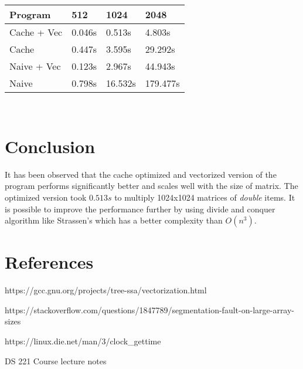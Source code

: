 \documentclass[11pt,a4paper,oneside]{article}
\begin{document}
    
	\begin{center}
	\begin{tabular}{|l|l|l|l|}
		\hline
		Program & 512 & 1024 &  2048\\
		\hline
		Cache + Vec & 0.046s & 0.513s & 4.803s \\
		Cache & 0.447s & 3.595s & 29.292s \\
		Naive + Vec & 0.123s & 2.967s & 44.943s \\
		Naive & 0.798s & 16.532s & 179.477s \\				
		\hline
	\end{tabular}
	\end{center}

     \begin{verbatim}
    
    \end{verbatim}

    \section{Conclusion}
    It has been observed that the cache optimized and vectorized version of the program performs significantly better and scales well with the size of matrix. The optimized version took $0.513s$ to multiply 1024x1024 matrices of \emph{double} items. It is possible to improve the performance further by using divide and conquer algorithm like Strassen's which has a better complexity than $O(n^3)$. 
    
    \section{References}
    
    \begin{list}{*}{}
    	\item https://gcc.gnu.org/projects/tree-ssa/vectorization.html
    	\item https://stackoverflow.com/questions/1847789/segmentation-fault-on-large-array-sizes
    	\item https://linux.die.net/man/3/clock\_gettime
    	\item DS 221 Course lecture notes
    \end{list}
\end{document}
